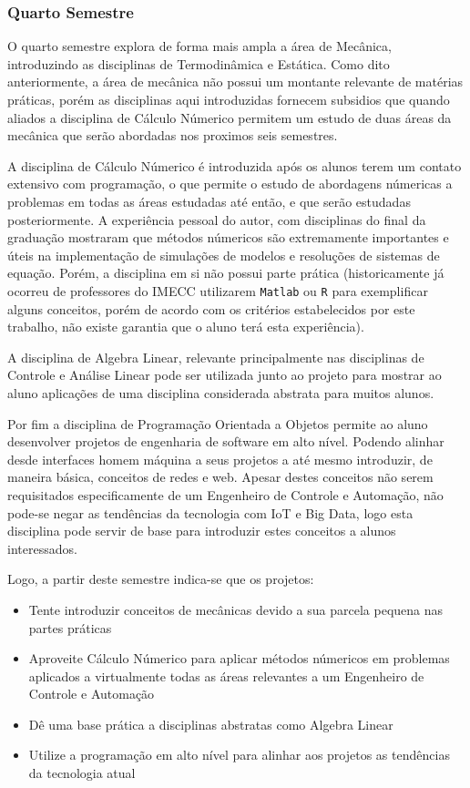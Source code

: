 \documentclass[12pt]{article} %
\begin{document}
\subsubsection{Quarto Semestre}
O quarto semestre explora de forma mais ampla a área de Mecânica, introduzindo as disciplinas de Termodinâmica e Estática. Como dito anteriormente, a área de mecânica não possui um montante relevante de matérias práticas, porém as disciplinas aqui introduzidas fornecem subsidios que quando aliados a disciplina de Cálculo Númerico permitem um estudo de duas áreas da mecânica que serão abordadas nos proximos seis semestres.

A disciplina de Cálculo Númerico é introduzida após os alunos terem um contato extensivo com programação, o que permite o estudo de abordagens númericas a problemas em todas as áreas estudadas até então, e que serão estudadas posteriormente. A experiência pessoal do autor, com disciplinas do final da graduação mostraram que métodos númericos são extremamente importantes e úteis na implementação de simulações de modelos e resoluções de sistemas de equação. Porém, a disciplina em si não possui parte prática (historicamente já ocorreu de professores do IMECC utilizarem \texttt{Matlab} ou \texttt{R} para exemplificar alguns conceitos, porém de acordo com os critérios estabelecidos por este trabalho, não existe garantia que o aluno terá esta experiência).

A disciplina de Algebra Linear, relevante principalmente nas disciplinas de Controle e Análise Linear pode ser utilizada junto ao projeto para mostrar ao aluno aplicações de uma disciplina considerada abstrata para muitos alunos.

Por fim a disciplina de Programação Orientada a Objetos permite ao aluno desenvolver projetos de engenharia de software em alto nível. Podendo alinhar desde interfaces homem máquina a seus projetos a até mesmo introduzir, de maneira básica, conceitos de redes e web. Apesar destes conceitos não serem requisitados especificamente de um Engenheiro de Controle e Automação, não pode-se negar as tendências da tecnologia com IoT e Big Data, logo esta disciplina pode servir de base para introduzir estes conceitos a alunos interessados.

Logo, a partir deste semestre indica-se que os projetos:

\begin{itemize}
\item Tente introduzir conceitos de mecânicas devido a sua parcela pequena nas partes práticas
\item Aproveite Cálculo Númerico para aplicar métodos númericos em problemas aplicados a virtualmente todas as áreas relevantes a um Engenheiro de Controle e Automação
\item Dê uma base prática a disciplinas abstratas como Algebra Linear
\item Utilize a programação em alto nível para alinhar aos projetos as tendências da tecnologia atual
\end{itemize}
\end{document}
